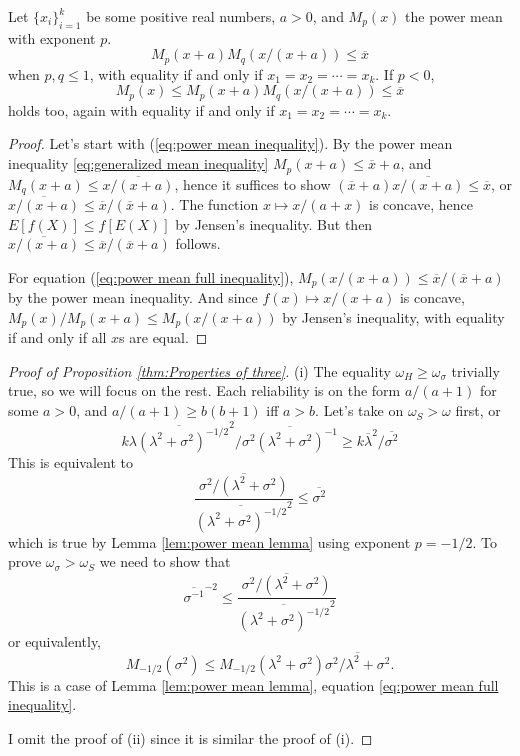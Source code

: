 \documentclass[twoside]{article}
\begin{document}
\begin{lem}
\label{lem:power mean lemma}Let $\{ x_{i}\} _{i=1}^{k}$
be some positive real numbers, $a>0$, and $M_{p}(x)$
the power mean with exponent $p$. 
\begin{equation}
M_{p}(x+a)M_{q}(x/{(x+a)})\leq\overline{x}\label{eq:power mean inequality}
\end{equation}
when $p,q\leq1$, with equality if and only if $x_{1}=x_{2}=\cdots=x_{k}$.
If $p<0$, 
\begin{equation}
M_{p}(x)\leq M_{p}(x+a)M_{q}(x/{(x+a)})\leq\overline{x}\label{eq:power mean full inequality}
\end{equation}
holds too, again with equality if and only if $x_{1}=x_{2}=\cdots=x_{k}$.
\end{lem}

\begin{proof}
Let's start with (\ref{eq:power mean inequality}). By the power
mean inequality \eqref{eq:generalized mean inequality}  $M_{p}(x+a)\leq\overline{x}+a$, and $M_{q}(x+a)\leq\overline{x/(x+a)}$,
hence it suffices to show $(\overline{x}+a)\overline{x/(x+a)}\leq\overline{x}$,
or $\overline{x/(x+a)}\leq\overline{x}/(\overline{x}+a)$.
The function $x\mapsto x/(a+x)$ is concave, hence $E[f(X)]\leq f[E(X)]$
by Jensen's inequality. But then $\overline{x/(x+a)}\leq\overline{x}/(\overline{x}+a)$
follows.

For equation (\ref{eq:power mean full inequality}), $M_{p}(x/({x+a}))\leq\overline{x}/(\overline{x}+a)$
by the power mean inequality. And since $f(x)\mapsto x/(x+a)$
is concave, $M_{p}(x)/M_{p}(x+a)\leq M_{p}(x/(x+a))$
by Jensen's inequality, with equality if and only if all $x$s are
equal.
\end{proof}

\begin{proof}[Proof of Proposition \ref{thm:Properties of three}]\label{proof:Properties}
(i) The equality $\omega_H \geq \omega_\sigma$ trivially true, so we will focus on the rest. Each reliability is on the form $a/(a+1)$ for some $a>0$, and $a/(a+1)\geq b(b+1)$
iff $a>b$. Let's take on $\omega_S > \omega$ first, or
\[
k\overline{\lambda(\lambda^{2}+\sigma^{2})^{-1/2}}^{2}/\overline{\sigma^{2}(\lambda^{2}+\sigma^{2})^{-1}}\geq k\overline{\lambda}^{2}/\overline{\sigma^{2}}
\]
This is equivalent to 
\[
\frac{\overline{\sigma^{2}/(\lambda^{2}+\sigma^{2})}}{\overline{(\lambda^{2}+\sigma^{2})^{-1/2}}^{2}}\leq\overline{\sigma^{2}}
\]
which is true by Lemma \ref{lem:power mean lemma} using exponent $p = -1/2$.
To prove $\omega_{\sigma}>\omega_{S}$ we need to show that
\[
\overline{\sigma^{-1}}^{-2}\leq\frac{\overline{\sigma^{2}/(\lambda^{2}+\sigma^{2})}}{\overline{(\lambda^{2}+\sigma^{2})^{-1/2}}^{2}}
\]
or equivalently,
\[
M_{-1/2}(\sigma^{2})\leq M_{-1/2}(\lambda^{2}+\sigma^{2})\overline{\sigma^{2}/\lambda^{2}+\sigma^{2}}.
\]
This is a case of Lemma \ref{lem:power mean lemma}, equation \eqref{eq:power mean full inequality}.

I omit the proof of (ii) since it is similar the proof of (i).
\end{proof}
\end{document}
